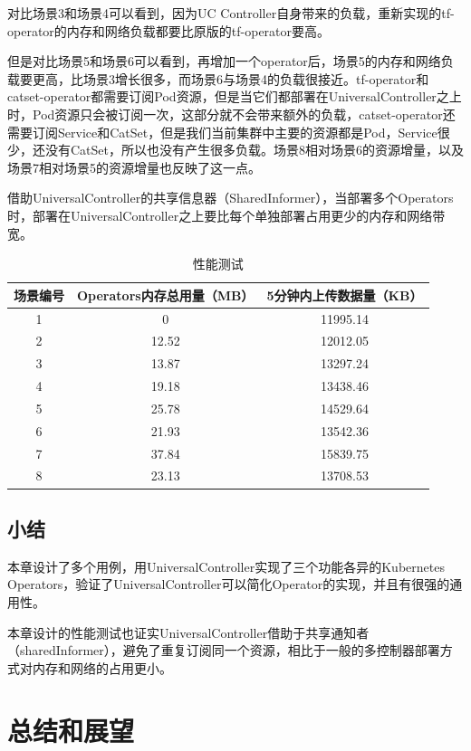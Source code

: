 \documentclass[macfonts,master]{njuthesis}
\begin{document}
对比场景3和场景4可以看到，因为UC Controller自身带来的负载，重新实现的tf-operator的内存和网络负载都要比原版的tf-operator要高。

但是对比场景5和场景6可以看到，再增加一个operator后，场景5的内存和网络负载要更高，比场景3增长很多，而场景6与场景4的负载很接近。tf-operator和catset-operator都需要订阅Pod资源，但是当它们都部署在UniversalController之上时，Pod资源只会被订阅一次，这部分就不会带来额外的负载，catset-operator还需要订阅Service和CatSet，但是我们当前集群中主要的资源都是Pod，Service很少，还没有CatSet，所以也没有产生很多负载。场景8相对场景6的资源增量，以及场景7相对场景5的资源增量也反映了这一点。

借助UniversalController的共享信息器（SharedInformer），当部署多个Operators时，部署在UniversalController之上要比每个单独部署占用更少的内存和网络带宽。
\begin{table}
  \centering
  \begin{tabular}{ccc}
    \toprule
    \textbf{场景编号} & \textbf{Operators内存总用量（MB）} & \textbf{5分钟内上传数据量（KB）} \\
    \midrule
    1  & 0 & 11995.14 \\
    2  & 12.52  &  12012.05 \\
    3  & 13.87  & 13297.24 \\
    4  & 19.18 &  13438.46 \\
    5  & 25.78  & 14529.64 \\
    6  & 21.93  & 13542.36 \\
    7  & 37.84  & 15839.75 \\
    8  & 23.13  & 13708.53 \\
    \bottomrule
  \end{tabular}
  \caption{性能测试}\label{table:test}
\end{table}

\section{小结}
本章设计了多个用例，用UniversalController实现了三个功能各异的Kubernetes Operators，验证了UniversalController可以简化Operator的实现，并且有很强的通用性。

本章设计的性能测试也证实UniversalController借助于共享通知者（sharedInformer），避免了重复订阅同一个资源，相比于一般的多控制器部署方式对内存和网络的占用更小。
\chapter{总结和展望}\label{chapter_concludes}
\end{document}
